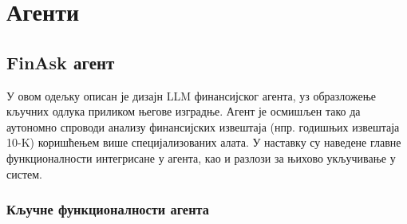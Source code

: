 \chapter{Агенти}

\section{FinAsk агент}

У овом одељку описан је дизајн LLM финансијског агента, уз образложење кључних одлука приликом његове изградње. Агент је осмишљен тако да аутономно спроводи анализу финансијских извештаја (нпр. годишњих извештаја 10-K) коришћењем више специјализованих алата. У наставку су наведене главне функционалности интегрисане у агента, као и разлози за њихово укључивање у систем.

\subsection{Кључне функционалности агента}

